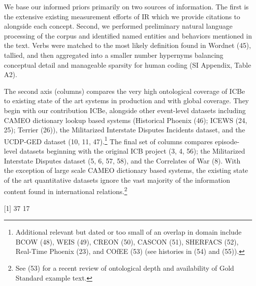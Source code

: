 \documentclass{article}
\renewcommand{\arraystretch}{0.8}
\begin{document}
We base our informed priors primarily on two sources of information. The
first is the extensive existing measurement efforts of IR which we
provide citations to alongside each concept. Second, we performed
preliminary natural language processing of the corpus and identified
named entities and behaviors mentioned in the text. Verbs were matched
to the most likely definition found in Wordnet (45), tallied, and then
aggregated into a smaller number hypernyms balancing conceptual detail
and manageable sparsity for human coding (SI Appendix, Table A2).

The second axis (columns) compares the very high ontological coverage of
ICBe to existing state of the art systems in production and with global
coverage. They begin with our contribution ICBe, alongside other
event-level datasets including CAMEO dictionary lookup based systems
(Historical Phoenix (46); ICEWS (24, 25); Terrier (26)), the Militarized
Interstate Disputes Incidents dataset, and the UCDP-GED dataset (10, 11,
47).\footnote{Additional relevant but dated or too small of an overlap
  in domain include BCOW (48), WEIS (49), CREON (50), CASCON (51),
  SHERFACS (52), Real-Time Phoenix (23), and COfEE (53) (see histories
  in (54) and (55)).} The final set of columns compares episode-level
datasets beginning with the original ICB project (3, 4, 56); the
Militarized Interstate Disputes dataset (5, 6, 57, 58), and the
Correlates of War (8). With the exception of large scale CAMEO
dictionary based systems, the existing state of the art quantitative
datasets ignore the vast majority of the information content found in
international relations.\footnote{See (53) for a recent review of
  ontological depth and availability of Gold Standard example text.}

\clearpage
\onecolumn

{[}1{]} 37 17

\providecommand{\docline}[3]{\noalign{\global\setlength{\arrayrulewidth}{#1}}\arrayrulecolor[HTML]{#2}\cline{#3}}

\setlength{\tabcolsep}{2pt}

\renewcommand*{\arraystretch}{0.75}
\end{document}
